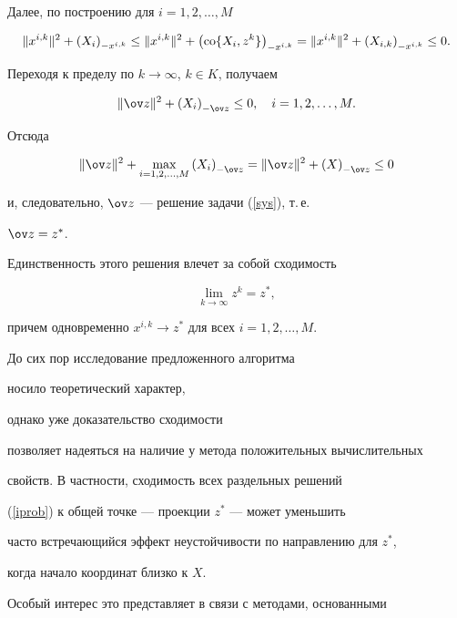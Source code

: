 \begin{pf}
Далее, по построению для $ i = 1,2,\dotsc, M $ 


$$


\| x^{i,k} \|^2 + \sP{X_i}{-x^{i,k}} \leq


\| x^{i,k} \|^2 + \sP{\co \lbrace X_i, z^k \rbrace }{-x^{i,k}} =


\| x^{i,k} \|^2 + \sP{X_{i,k}}{-x^{i,k}} \leq 0.


$$


Переходя к пределу по $k\to\infty$, $k\in K$, получаем


$$


\| \ov z \|^2 + \sP{X_i}{-\ov z} \leq 0,\quad i = 1,2,\dotsc, M.


$$


Отсюда


$$


\| \ov z \|^2 + \max_{ i = 1,2,\dotsc, M} \sP{X_i}{-\ov z} =


\| \ov z \|^2 + \sP{X}{-\ov z} \leq 0


$$


и, следовательно, $\ov z$ --- решение задачи (\ref{sys}), т.\,е.


$\ov z = z^\ast$.


Единственность этого решения влечет за собой сходимость


$$


\lim_{k\to\infty} z^k = z^\ast,


$$


причем одновременно $x^{i,k}\to z^\ast$ для всех $i=1,2,\dotsc,M$.


\end{pf}





До сих пор исследование предложенного  алгоритма 


носило теоретический характер,


однако уже доказательство сходимости 


позволяет надеяться на наличие у метода положительных вычислительных


свойств. В частности, сходимость всех раздельных решений


(\ref{iprob}) к общей точке --- проекции $z^\ast$ --- может уменьшить


часто встречающийся эффект неустойчивости по направлению для $z^\ast$,


когда начало координат близко к $X$.


Особый интерес это представляет в связи с методами, основанными 



